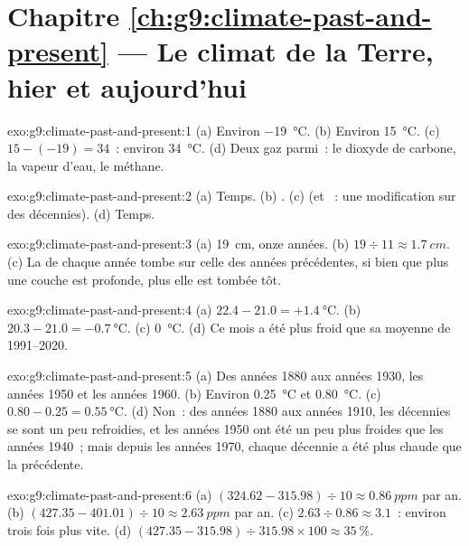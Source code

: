 \section*{Chapitre \ref{ch:g9:climate-past-and-present} --- Le climat de la Terre, hier et aujourd'hui}

\begin{solution}{exo:g9:climate-past-and-present:1}
(a) Environ \qty{-19}{\degreeCelsius}. (b) Environ \qty{15}{\degreeCelsius}.
(c) $15 - (-19) = 34$~: environ \qty{34}{\degreeCelsius}. (d) Deux gaz
parmi~: le dioxyde de carbone, la vapeur d'eau, le méthane.
\end{solution}

\begin{solution}{exo:g9:climate-past-and-present:2}
(a) Temps. (b) . (c)  (et ~: une
modification sur des décennies). (d) Temps.
\end{solution}

\begin{solution}{exo:g9:climate-past-and-present:3}
(a) \qty{19}{cm}, onze années. (b) $19 \div 11 \approx \qty{1.7}{cm}$.
(c) La  de chaque année tombe sur celle des années précédentes, si
bien que plus une couche est profonde, plus elle est tombée tôt.
\end{solution}

\begin{solution}{exo:g9:climate-past-and-present:4}
(a) $22.4 - 21.0 = +\qty{1.4}{\degreeCelsius}$. (b) $20.3 - 21.0 =
\qty{-0.7}{\degreeCelsius}$. (c) \qty{0}{\degreeCelsius}. (d) Ce mois a
été plus froid que sa moyenne de 1991--2020.
\end{solution}

\begin{solution}{exo:g9:climate-past-and-present:5}
(a) Des années 1880 aux années 1930, les années 1950 et les années 1960.
(b) Environ \qty{0.25}{\degreeCelsius} et \qty{0.80}{\degreeCelsius}. (c) $0.80 -
0.25 = \qty{0.55}{\degreeCelsius}$. (d) Non~: des années 1880 aux années
1910, les décennies se sont un peu refroidies, et les années 1950 ont été
un peu plus froides que les années 1940~; mais depuis les années 1970,
chaque décennie a été plus chaude que la précédente.
\end{solution}

\begin{solution}{exo:g9:climate-past-and-present:6}
(a) $(324.62 - 315.98) \div 10 \approx \qty{0.86}{ppm}$ par an. (b)
$(427.35 - 401.01) \div 10 \approx \qty{2.63}{ppm}$ par an. (c) $2.63
\div 0.86 \approx 3.1$~: environ trois fois plus vite. (d) $(427.35 - 315.98)
\div 315.98 \times 100 \approx 35~\%$.
\end{solution}

